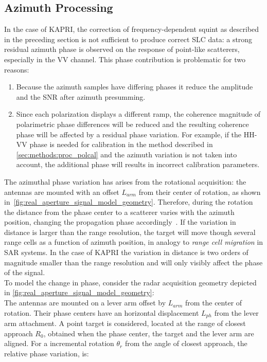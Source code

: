 \subsection{Azimuth Processing}\label{sec:methods:azimuth_processing}
In the case of KAPRI, the correction of frequency-dependent squint as described in the preceding section is not sufficient to produce correct SLC data: a strong residual  azimuth phase is observed on the response of point-like scatterers, especially in the VV channel. This phase contribution is problematic for two reasons:
\begin{enumerate}
	\item Because the azimuth samples have differing phases it reduce the amplitude and the SNR after azimuth presumming. 
  \item Since each polarization displays a different ramp, the coherence magnitude of polarimetric phase differences will be reduced and the resulting coherence phase will be affected by a residual phase variation. For example, if the HH-VV phase is needed for calibration in the method described in \autoref{sec:methods:proc_polcal} and the azimuth variation is not taken into account, the additional phase will results in incorrect calibration parameters.\label{item:phase_variation}
\end{enumerate}
The azimuthal phase variation has arises from the rotational acquisition: the antennas are mounted with an offset $L_{arm}$  from their center of rotation, as shown in~\autoref{fig:real_aperture_signal_model_geometry}. Therefore, during the rotation the distance from the phase center to a scatterer varies with the azimuth position, changing the propagation phase accordingly~\cite{Lee2014}. If the variation in distance is  larger than the range resolution, the target will move though several range cells as a function of azimuth position, in analogy to \emph{range cell migration} in SAR systems. In the case of KAPRI the variation in distance is two orders of magnitude smaller than the range resolution and will only visibly affect the phase of the signal.\\
To model the change in phase, consider the radar acquisition geometry depicted in \autoref{fig:real_aperture_signal_model_geometry}:\\
The antennas are mounted on a lever arm offset by $L_{arm}$ from the center of rotation.
Their phase centers have an horizontal displacement $L_{ph}$ from the lever arm attachment.
A point target is considered, located at the  range of closest approach $R_0$, obtained when the phase center, the target and the lever arm are aligned. For a incremental rotation  $\theta_r$ from the angle of closest approach, the relative phase variation, is:
